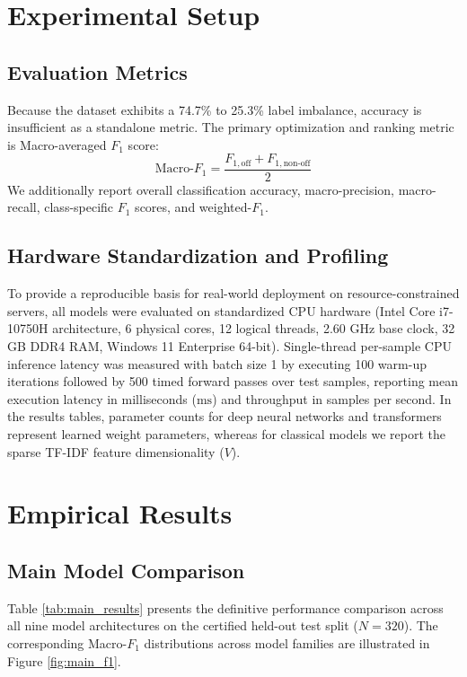 \documentclass[11pt,a4paper]{article}
\begin{document}
\section{Experimental Setup}\label{sec:setup}

\subsection{Evaluation Metrics}
Because the dataset exhibits a 74.7\% to 25.3\% label imbalance, accuracy is insufficient as a standalone metric. The primary optimization and ranking metric is Macro-averaged $F_1$ score:
\begin{equation}
    \text{Macro-}F_1 = \frac{F_{1, \text{off}} + F_{1, \text{non-off}}}{2}
\end{equation}
We additionally report overall classification accuracy, macro-precision, macro-recall, class-specific $F_1$ scores, and weighted-$F_1$.

\subsection{Hardware Standardization and Profiling}
To provide a reproducible basis for real-world deployment on resource-constrained servers, all models were evaluated on standardized CPU hardware (Intel Core i7-10750H architecture, 6 physical cores, 12 logical threads, 2.60 GHz base clock, 32 GB DDR4 RAM, Windows 11 Enterprise 64-bit). Single-thread per-sample CPU inference latency was measured with batch size 1 by executing 100 warm-up iterations followed by 500 timed forward passes over test samples, reporting mean execution latency in milliseconds ($\text{ms}$) and throughput in samples per second. In the results tables, parameter counts for deep neural networks and transformers represent learned weight parameters, whereas for classical models we report the sparse TF-IDF feature dimensionality ($V$).

\section{Empirical Results}\label{sec:results}

\subsection{Main Model Comparison}
Table \ref{tab:main_results} presents the definitive performance comparison across all nine model architectures on the certified held-out test split ($N = 320$). The corresponding Macro-$F_1$ distributions across model families are illustrated in Figure \ref{fig:main_f1}.
\end{document}
